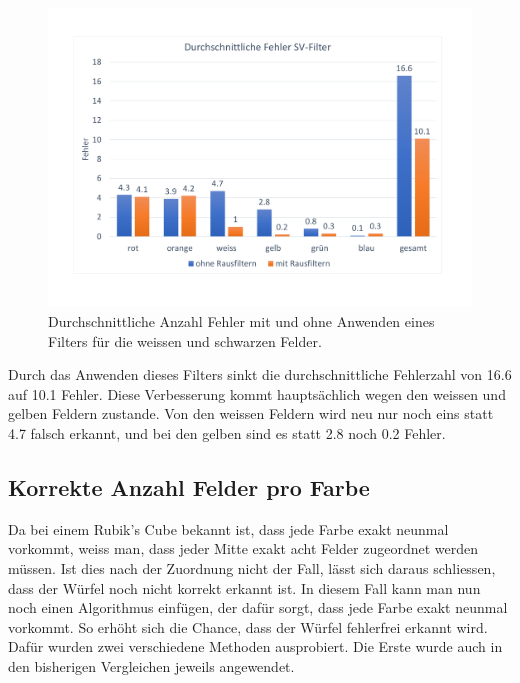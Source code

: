 \documentclass[a4paper, 12pt]{article}
\begin{document}
\begin{figure}[H]
\includegraphics[scale=0.4]{Fehler_SV_Filter} 
\caption{Durchschnittliche Anzahl Fehler mit und ohne Anwenden eines Filters für die weissen und schwarzen Felder.}
\end{figure}
\noindent
Durch das Anwenden dieses Filters sinkt die durchschnittliche Fehlerzahl von 16.6 auf 10.1 Fehler. Diese Verbesserung kommt hauptsächlich wegen den weissen und gelben Feldern zustande. Von den weissen Feldern wird neu nur noch eins statt 4.7 falsch erkannt, und bei den gelben sind es statt 2.8 noch 0.2 Fehler.
\subsection{Korrekte Anzahl Felder pro Farbe}
Da bei einem Rubik's Cube bekannt ist, dass jede Farbe exakt neunmal vorkommt, weiss man, dass jeder Mitte exakt acht Felder zugeordnet werden müssen. Ist dies nach der Zuordnung nicht der Fall, lässt sich daraus schliessen, dass der Würfel noch nicht korrekt erkannt ist. In diesem Fall kann man nun noch einen Algorithmus einfügen, der dafür sorgt, dass jede Farbe exakt neunmal vorkommt. So erhöht sich die Chance, dass der Würfel fehlerfrei erkannt wird. Dafür wurden zwei verschiedene Methoden ausprobiert. Die Erste wurde auch in den bisherigen Vergleichen jeweils angewendet. 
\end{document}
